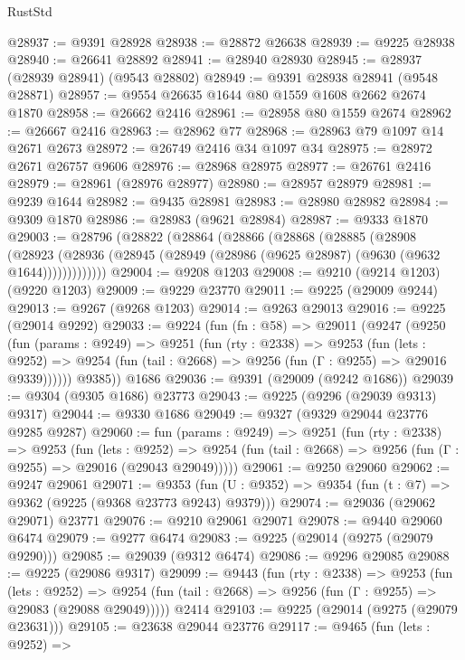 \begin{lexlean}{RustStd}
\begin{coremodule}
@28937 := @9391 @28928
@28938 := @28872 @26638
@28939 := @9225 @28938
@28940 := @26641 @28892
@28941 := @28940 @28930
@28945 := @28937 (@28939 @28941) (@9543 @28802)
@28949 := @9391 @28938 @28941 (@9548 @28871)
@28957 := @9554 @26635 @1644 @80 @1559 @1608 @2662 @2674 @1870
@28958 := @26662 @2416
@28961 := @28958 @80 @1559 @2674
@28962 := @26667 @2416
@28963 := @28962 @77
@28968 := @28963 @79 @1097 @14 @2671 @2673
@28972 := @26749 @2416 @34 @1097 @34
@28975 := @28972 @2671 @26757 @9606
@28976 := @28968 @28975
@28977 := @26761 @2416
@28979 := @28961 (@28976 @28977)
@28980 := @28957 @28979
@28981 := @9239 @1644
@28982 := @9435 @28981
@28983 := @28980 @28982
@28984 := @9309 @1870
@28986 := @28983 (@9621 @28984)
@28987 := @9333 @1870
@29003 := @28796
    (@28822
      (@28864
        (@28866
          (@28868
            (@28885
              (@28908
                (@28923
                  (@28936 (@28945 (@28949 (@28986 (@9625 @28987) (@9630 (@9632 @1644)))))))))))))
@29004 := @9208 @1203
@29008 := @9210 (@9214 @1203) (@9220 @1203)
@29009 := @9229 @23770
@29011 := @9225 (@29009 @9244)
@29013 := @9267 (@9268 @1203)
@29014 := @9263 @29013
@29016 := @9225 (@29014 @9292)
@29033 := @9224
    (fun (fn : @58) =>
    @29011
      (@9247
        (@9250
          (fun (params : @9249) =>
          @9251
            (fun (rty : @2338) =>
            @9253
              (fun (lets : @9252) =>
              @9254 (fun (tail : @2668) => @9256 (fun (Γ : @9255) => @29016 @9339))))))
        @9385))
    @1686
@29036 := @9391 (@29009 (@9242 @1686))
@29039 := @9304 (@9305 @1686) @23773
@29043 := @9225 (@9296 (@29039 @9313) @9317)
@29044 := @9330 @1686
@29049 := @9327 (@9329 @29044 @23776 @9285 @9287)
@29060 := fun (params : @9249) =>
  @9251
    (fun (rty : @2338) =>
    @9253
      (fun (lets : @9252) =>
      @9254 (fun (tail : @2668) => @9256 (fun (Γ : @9255) => @29016 (@29043 @29049)))))
@29061 := @9250 @29060
@29062 := @9247 @29061
@29071 := @9353
    (fun (U : @9352) => @9354 (fun (t : @7) => @9362 (@9225 (@9368 @23773 @9243) @9379)))
@29074 := @29036 (@29062 @29071) @23771
@29076 := @9210 @29061 @29071
@29078 := @9440 @29060 @6474
@29079 := @9277 @6474
@29083 := @9225 (@29014 (@9275 (@29079 @9290)))
@29085 := @29039 (@9312 @6474)
@29086 := @9296 @29085
@29088 := @9225 (@29086 @9317)
@29099 := @9443
    (fun (rty : @2338) =>
    @9253
      (fun (lets : @9252) =>
      @9254 (fun (tail : @2668) => @9256 (fun (Γ : @9255) => @29083 (@29088 @29049)))))
    @2414
@29103 := @9225 (@29014 (@9275 (@29079 @23631)))
@29105 := @23638 @29044 @23776
@29117 := @9465
    (fun (lets : @9252) =>

\end{coremodule}
\end{lexlean}
